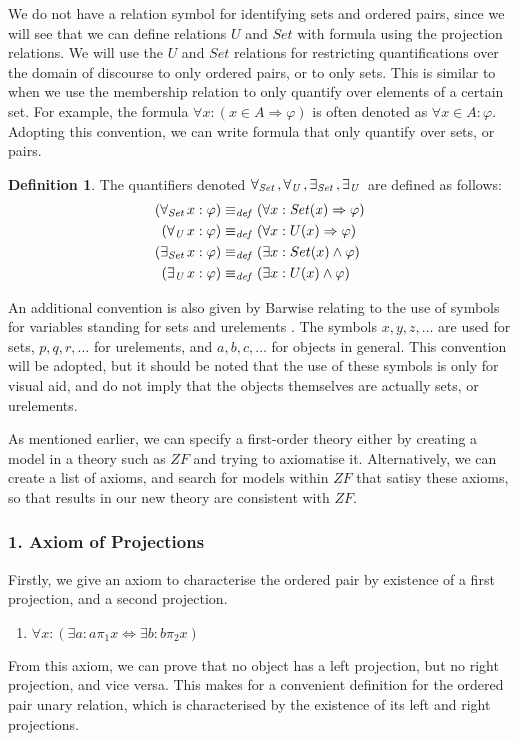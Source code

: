 \documentclass[11pt]{report}
\newcommand{\all}[1]{\forall_{\mathit{#1}}\hspace{0.5mm}}
\newcommand{\ex}[1]{\exists_{\mathit{#1}}\hspace{0.5mm}}
\newcommand{\eqdef}{\equiv_\mathit{def}}
\newcommand{\pleft}{\mathrel{\pi_1}}
\newcommand{\pright}{\mathrel{\pi_2}}
\theoremstyle{definition}
\theoremstyle{theorem}
\theoremstyle{lemma}
\newtheorem{definition}{Definition}[section]
\begin{document}
We do not have a relation symbol for identifying sets and ordered pairs, since we will see that we can define relations $U$ and $\mathit{Set}$ with formula using the projection relations.
We will use the $\mathit{U}$ and $\mathit{Set}$ relations for restricting quantifications over the domain of discourse to only ordered pairs, or to only sets.
This is similar to when we use the membership relation to only quantify over elements of a certain set.
For example, the formula $\forall x: (x\in A \Rightarrow \varphi)$ is often denoted as $\forall x\in A: \varphi$.
Adopting this convention, we can write formula that only quantify over sets, or pairs.
\begin{definition}
The quantifiers denoted $\all{Set}, \all{U}, \ex{Set}, \ex{U}$ are defined as follows:
\begin{align*}
  (\all{Set} x: \varphi) &\eqdef (\forall x: \mathit{Set(x)} \Rightarrow \varphi)\\
  (\all{U} x: \varphi) &\eqdef (\forall x: U(x) \Rightarrow \varphi)\\
  (\ex{Set} x: \varphi) &\eqdef (\exists x: Set(x) \wedge \varphi)\\
  (\ex{U} x: \varphi) &\eqdef (\exists x: U(x) \wedge \varphi)
\end{align*}
\end{definition}
\noindent
An additional convention is also given by Barwise relating to the use of symbols for variables standing for sets and urelements \cite{barwise}.
The symbols $x,y,z,\ldots$ are used for sets, $p,q,r,\ldots$ for urelements, and $a,b,c,\ldots$ for objects in general.
This convention will be adopted, but it should be noted that the use of these symbols is only for visual aid, and do not imply that the objects themselves are actually sets, or urelements.

As mentioned earlier, we can specify a first-order theory either by creating a model in a theory such as $\mathit{ZF}$ and trying to axiomatise it.
Alternatively, we can create a list of axioms, and search for models within $\mathit{ZF}$ that satisy these axioms, so that results in our new theory are consistent with $\mathit{ZF}$.

\subsubsection*{1. Axiom of Projections}
Firstly, we give an axiom to characterise the ordered pair by existence of a first projection, and a second projection.
\begin{enumerate}[label=(\roman*)]
\item $\forall x: (\exists a: a\pleft x \Leftrightarrow \exists b: b\pright x)$
\end{enumerate}
From this axiom, we can prove that no object has a left projection, but no right projection, and vice versa.
This makes for a convenient definition for the ordered pair unary relation, which is characterised by the existence of its left and right projections.
\end{document}

